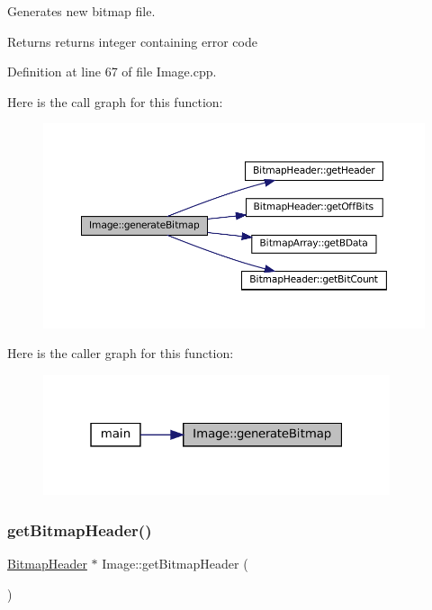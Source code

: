 Generates new bitmap file. 

\begin{DoxyReturn}{Returns}
returns integer containing error code 
\end{DoxyReturn}


Definition at line 67 of file Image.\+cpp.

Here is the call graph for this function\+:
\nopagebreak
\begin{figure}[H]
\begin{center}
\leavevmode
\includegraphics[width=350pt]{classImage_a3ca1ae6c1eb2846bfba066b01e6020e1_cgraph}
\end{center}
\end{figure}
Here is the caller graph for this function\+:
\nopagebreak
\begin{figure}[H]
\begin{center}
\leavevmode
\includegraphics[width=289pt]{classImage_a3ca1ae6c1eb2846bfba066b01e6020e1_icgraph}
\end{center}
\end{figure}
\mbox{\label{classImage_a8c824ffac0c866a94752a2c1047932af}} 
\subsubsection{\texorpdfstring{getBitmapHeader()}{getBitmapHeader()}}
{\footnotesize\ttfamily \mbox{\hyperlink{classBitmapHeader}{Bitmap\+Header}} $\ast$ Image\+::get\+Bitmap\+Header (\begin{DoxyParamCaption}{ }\end{DoxyParamCaption})}



